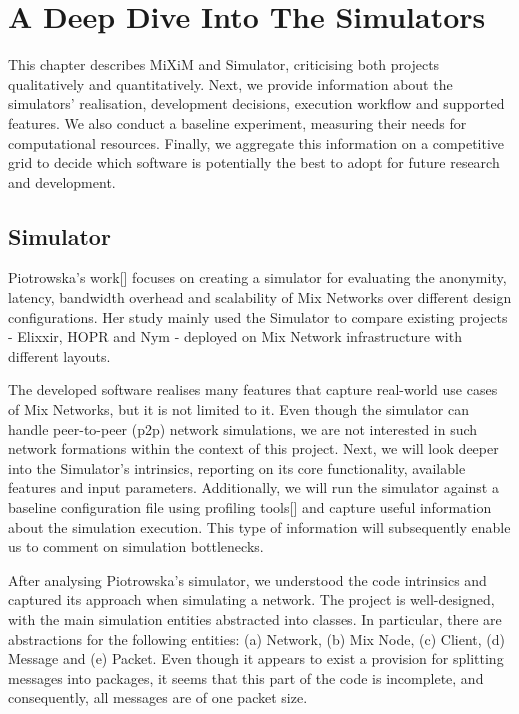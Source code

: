 \documentclass[logo,msc,cyber]{infthesis}   %
\begin{document}
\chapter{A Deep Dive Into The Simulators}

This chapter describes MiXiM and Simulator, criticising both projects
qualitatively and quantitatively. Next, we provide information about the
simulators' realisation, development decisions, execution workflow and supported
features. We also conduct a baseline experiment, measuring their needs for
computational resources. Finally, we aggregate this information on a competitive
grid to decide which software is potentially the best to adopt for future
research and development. 

\section{Simulator}
Piotrowska's work[] focuses on creating a simulator for evaluating the
anonymity, latency, bandwidth overhead and scalability of Mix Networks over
different design configurations. Her study mainly used the Simulator to compare
existing projects - Elixxir, HOPR and Nym - deployed on Mix Network
infrastructure with different layouts.

The developed software realises many features that capture real-world use cases
of Mix Networks, but it is not limited to it. Even though the simulator can
handle peer-to-peer (p2p) network simulations, we are not interested in such
network formations within the context of this project. Next, we will look deeper
into the Simulator's intrinsics, reporting on its core functionality, available
features and input parameters. Additionally, we will run the simulator against a
baseline configuration file using profiling tools[] and capture useful
information about the simulation execution. This type of information will
subsequently enable us to comment on simulation bottlenecks.

After analysing Piotrowska's simulator, we understood the code intrinsics and
captured its approach when simulating a network. The project is well-designed,
with the main simulation entities abstracted into classes. In particular, there
are abstractions for the following entities: (a) Network, (b) Mix Node, (c) Client,
(d) Message and (e) Packet. Even though it appears to exist a provision for
splitting messages into packages, it seems that this part of the code is
incomplete, and consequently, all messages are of one packet size.
\end{document}

